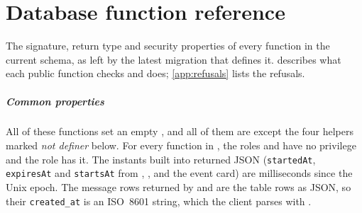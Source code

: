 \chapter{Database function reference}
\label{app:db-functions}

The signature, return type and security properties of every function in the current schema, as left by
the latest migration that defines it.  describes what each public function checks
and does; \cref{app:refusals} lists the refusals.

\paragraph{Common properties} All of these functions set an empty , and all of them are
 except the four helpers marked \emph{not definer} below. For every function in , the
roles  and  have no  privilege and the role 
has it. The instants built into returned JSON (\texttt{startedAt}, \texttt{expiresAt} and
\texttt{startsAt} from , ,  and the event card) are
milliseconds since the Unix epoch. The message rows returned by  and
 are the table rows as JSON, so their \texttt{created\_at} is an ISO~8601
string, which the client parses with .

